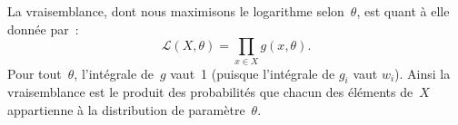\documentclass[main.tex]{subfiles}
\begin{document}


La vraisemblance, dont nous maximisons le logarithme selon~$\theta$, est quant à elle donnée par~:
\begin{equation}
\mathcal{L}(X,\theta) = \prod_{x \in X} g(x,\theta).
\end{equation}
Pour tout~$\theta$, l'intégrale de~$g$ vaut~1 (puisque l'intégrale de $g_i$ vaut $w_i$). 
Ainsi la vraisemblance est le produit des probabilités que chacun des éléments de~$X$ appartienne à la distribution de paramètre~$\theta$.
\end{document}

